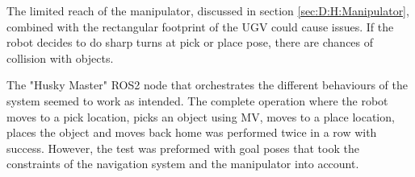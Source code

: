 The limited reach of the manipulator, discussed in section \ref{sec:D:H:Manipulator}, combined with the rectangular footprint of the UGV could cause issues. If the robot decides to do sharp turns at pick or place pose, there are chances of collision with objects.

The "Husky Master" ROS2 node that orchestrates the different behaviours of the system seemed to work as intended. The complete operation where the robot moves to a pick location, picks an object using MV, moves to a place location, places the object and moves back home was performed twice in a row with success. However, the test was preformed with goal poses that took the constraints of the navigation system and the manipulator into account.